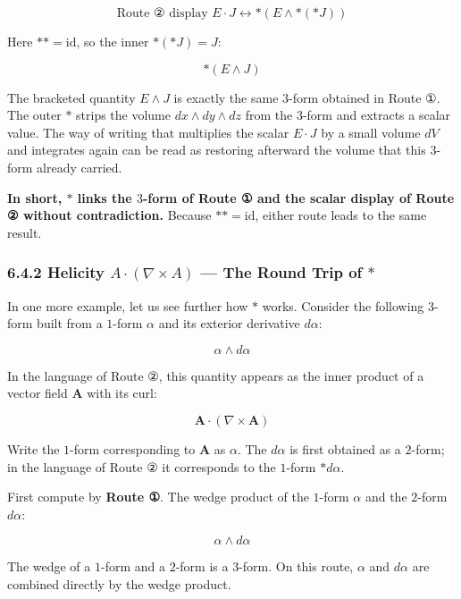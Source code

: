 \[\text{Route ② display }E\cdot J \longleftrightarrow \ast(E \wedge \ast(\ast J))\]

Here \(\ast\ast = \mathrm{id}\), so the inner \(\ast(\ast J) = J\):

\[\ast(E \wedge J)\]

The bracketed quantity \(E \wedge J\) is exactly the same \(3\)-form
obtained in Route ①. The outer \(\ast\) strips the volume
\(dx \wedge dy \wedge dz\) from the \(3\)-form and extracts a scalar
value. The way of writing that multiplies the scalar \(E \cdot J\) by a
small volume \(dV\) and integrates again can be read as restoring
afterward the volume that this \(3\)-form already carried.

\textbf{In short, $\ast$ links the $3$-form of Route ① and the scalar display of Route ② without contradiction.}
Because \(\ast\ast = \mathrm{id}\), either route leads to the same
result.

\hypertarget{helicity-a-cdot-nabla-times-a-the-round-trip-of-ast}{%
\subsubsection{\texorpdfstring{6.4.2 Helicity
\(A \cdot (\nabla \times A)\) --- The Round Trip of
\(\ast\)}{6.4.2 Helicity A \textbackslash cdot (\textbackslash nabla \textbackslash times A) --- The Round Trip of \textbackslash ast}}\label{helicity-a-cdot-nabla-times-a-the-round-trip-of-ast}}

In one more example, let us see further how \(\ast\) works. Consider the
following \(3\)-form built from a \(1\)-form \(\alpha\) and its exterior
derivative \(d\alpha\):

\[\alpha \wedge d\alpha\]

In the language of Route ②, this quantity appears as the inner product
of a vector field \(\mathbf{A}\) with its curl:

\[\mathbf{A} \cdot (\nabla \times \mathbf{A})\]

Write the \(1\)-form corresponding to \(\mathbf{A}\) as \(\alpha\). The
\(d\alpha\) is first obtained as a \(2\)-form; in the language of Route
② it corresponds to the \(1\)-form \(\ast d\alpha\).

First compute by \textbf{Route ①}. The wedge product of the \(1\)-form
\(\alpha\) and the \(2\)-form \(d\alpha\):

\[\alpha \wedge d\alpha\]

The wedge of a \(1\)-form and a \(2\)-form is a \(3\)-form. On this
route, \(\alpha\) and \(d\alpha\) are combined directly by the wedge
product.

